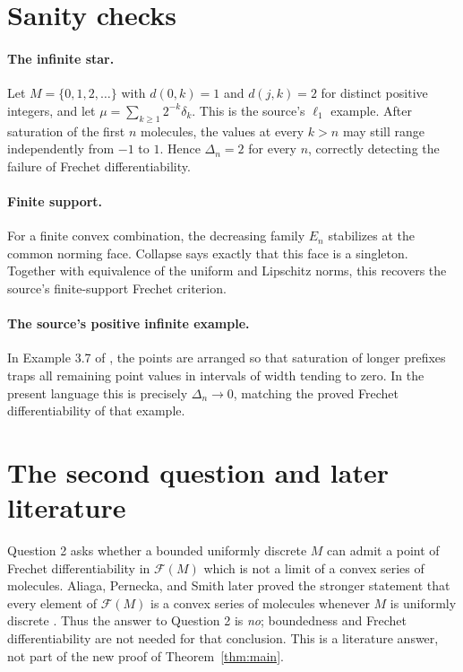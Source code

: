 \documentclass[11pt]{article}
\newcommand{\F}{\mathcal F}
\begin{document}
\section{Sanity checks}

\paragraph{The infinite star.}
Let $M=\{0,1,2,\ldots\}$ with $d(0,k)=1$ and $d(j,k)=2$ for distinct
positive integers, and let
$\mu=\sum_{k\geq1}2^{-k}\delta_k$. This is the source's $\ell_1$ example.
After saturation of the first $n$ molecules, the values at every $k>n$ may
still range independently from $-1$ to $1$. Hence $\Delta_n=2$ for every
$n$, correctly detecting the failure of Frechet differentiability.

\paragraph{Finite support.}
For a finite convex combination, the decreasing family $E_n$ stabilizes at
the common norming face. Collapse says exactly that this face is a singleton.
Together with equivalence of the uniform and Lipschitz norms, this recovers
the source's finite-support Frechet criterion.

\paragraph{The source's positive infinite example.}
In Example 3.7 of \cite{source}, the points are arranged so that saturation
of longer prefixes traps all remaining point values in intervals of width
tending to zero. In the present language this is precisely
$\Delta_n\to0$, matching the proved Frechet differentiability of that
example.

\section{The second question and later literature}
\label{sec:q2}

Question 2 asks whether a bounded uniformly discrete $M$ can admit a point of
Frechet differentiability in $\F(M)$ which is not a limit of a convex series
of molecules. Aliaga, Pernecka, and Smith later proved the stronger statement
that every element of $\F(M)$ is a convex series of molecules whenever $M$
is uniformly discrete \cite{APS}. Thus the answer to Question 2 is
\emph{no}; boundedness and Frechet differentiability are not needed for that
conclusion. This is a literature answer, not part of the new proof of
Theorem~\ref{thm:main}.
\end{document}

